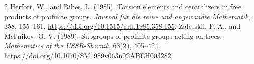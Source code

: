 \documentclass[11pt,a4paper]{article}
\begin{document}

\begin{thebibliography}{2}
Herfort, W., and Ribes, L. (1985).
Torsion elements and centralizers in free products of profinite groups.
\emph{Journal f\"ur die reine und angewandte Mathematik}, 358, 155--161.
\url{https://doi.org/10.1515/crll.1985.358.155}.
Zalesskii, P. A., and Mel'nikov, O. V. (1989).
Subgroups of profinite groups acting on trees.
\emph{Mathematics of the USSR-Sbornik}, 63(2), 405--424.
\url{https://doi.org/10.1070/SM1989v063n02ABEH003282}.
\end{thebibliography}
\end{document}
